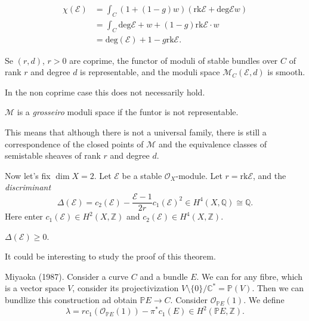 \begin{theorem}
\label{theorem-euler-characteristic-moduli}
\begin{align*}
\chi(\mathcal{E})
&=\int_C(1+(1-g)w)(\text{rk}\mathcal{E}+\text{deg}\mathcal{E}w)\\
&=\int_C \text{deg}\mathcal{E}+w+(1-g)\text{rk}\mathcal{E}\cdot w\\
&=\text{deg}(\mathcal{E})+1-g \text{rk}\mathcal{E}.
\end{align*}
\end{theorem}

\begin{example}
\label{example-hilbert-polynomial-sheaf}
\end{example}

\begin{theorem}
\label{theorem-moduli-suave}
Se $(r,d)$, $r>0$ are coprime,
the functor of moduli of stable bundles
over $C$ of rank $r$ and degree $d$ 
is representable, and the moduli space
$\mathcal{M}_C(\mathcal{E},d)$ is smooth.
\end{theorem}

\noindent
In the non coprime case this does not necessarily hold.

\begin{definition}
\label{definition-}
$\mathcal{M}$ is a {\it grosseiro} moduli space
if the funtor is not representable.
\end{definition}

\noindent
This means that although there is not
a universal family,
there is still a correspondence
of the closed points of $\mathcal{M}$ and the
equivalence classes of semistable sheaves
of rank $r$ and degree $d$.

\medskip\noindent
Now let's fix $\dim X=2$.
Let $\mathcal{E}$ be a stable $\mathcal{O}_X$-module.
Let $r=\text{rk}\mathcal{E}$,
and the {\it discriminant}
$$
\Delta(\mathcal{E})=c_2(\mathcal{E})-\frac{\mathcal{E}-1}{2r}c_1(\mathcal{E})^2
\in H^4(X,\mathbb{Q})\cong\mathbb{Q}.
$$
Here enter $c_1(\mathcal{E}) \in H^2(X,\mathbb{Z})$
and $c_2(\mathcal{E}) \in H^4(X,\mathbb{Z})$.

\begin{theorem}[Bogomolov]
\label{theorem-bogomolov}
$\Delta(\mathcal{E}) \geq 0$.
\end{theorem}

\noindent
It could be interesting to study the proof of this theorem.

\medskip\noindent
Miyaoka (1987). Consider a curve $C$ and a bundle $E$.
We can for any fibre, which is a vector space $V$,
consider its projectivization
$V\setminus\{0\}/\mathbb{C}^*=\mathbb{P}(V)$.
Then we can bundlize this construction ad obtain
$\mathbb{P}E \to C$.
Consider $\mathcal{O}_{\mathbb{P}E}(1)$.
We define
$$
\lambda=rc_1(\mathcal{O}_{\mathbb{P}E}(1))
-\pi^*c_1(E) \in H^2(\mathbb{P}E,\mathbb{Z}).
$$

